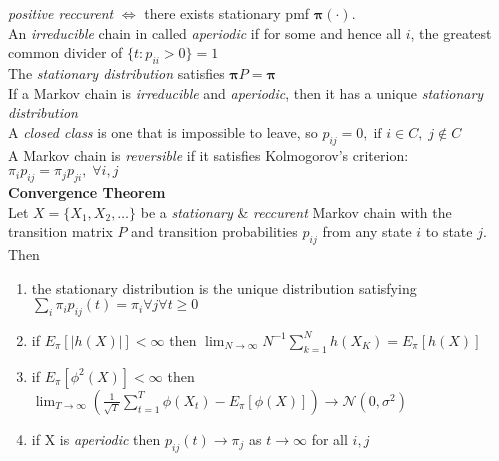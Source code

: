 \documentclass[10pt]{article} %
\begin{document}
\begin{multicols}{4}
{\begin{flushleft}
            \textit{positive reccurent} \(\Leftrightarrow\) there exists stationary
            pmf \(\boldsymbol{\pi}(\cdot)\).\\
            An \textit{irreducible} chain in called \textit{aperiodic}
            if for some and hence all \(i\), the greatest common divider of
            \(\{t: p_{ii}>0\} = 1\)\\
            The \textit{stationary distribution} satisfies \(\boldsymbol{\pi} P=\boldsymbol{\pi}\)\\
            If a Markov chain is \textit{irreducible} and \textit{aperiodic}, then it has a unique \textit{stationary distribution}\\
            A \textit{closed class} is one that is impossible to leave, so \(p_{ij} = 0,\;\text{if } i \in C,\; j \not \in C\)\\
            A Markov chain is \textit{reversible} if it satisfies Kolmogorov's criterion:\\
            \(
            \pi_i p_{ij} = \pi_j p_{ji},\; \forall i,j
            \)\\

            \textbf{Convergence Theorem}\\
            Let \(X = \{X_1,X_2,\dots\}\) be a \textit{stationary} \& \textit{reccurent} Markov chain with the transition
            matrix \(P\) and transition probabilities \(p_{ij}\) from any
            state \(i\) to state \(j\). Then
            \begin{enumerate}
                \item the stationary distribution is the unique distribution satisfying \(\sum_{i} \pi_i p_{ij}(t) = \pi_i \forall j \forall t \geq 0\)
                \item if \(E_{\pi}[|h(X)|]<\infty\) then \(\lim_{N \to \infty} N^{-1}\sum_{k=1}^N h(X_K) = E_{\pi}[h(X)]\)
                \item if \(E_{\pi}[\phi^2(X)]<\infty\) then {\tiny \(\lim_{T\to \infty} \left(\frac{1}{\sqrt{T}}\sum_{t=1}^T\phi(X_t)-E_{\pi}[\phi(X)]\right) \to \mathcal{N}(0,\sigma^2)\)}
                \item if X is \textit{aperiodic} then \(p_{ij}(t) \to \pi_j\) as \(t\to \infty\) for all \(i,j\)
            \end{enumerate}


\end{flushleft}}
\end{multicols}
\end{document}
